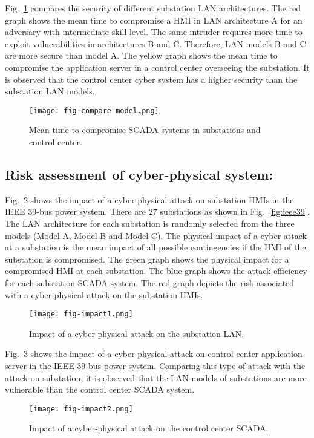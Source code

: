 Fig.~\ref{fig:result-compare} compares the security of different substation LAN architectures. The red graph shows the mean time to compromise a HMI in LAN architecture A for an adversary with intermediate skill level. The same intruder requires more time to exploit vulnerabilities in architectures B and C. Therefore, LAN models B and C are more secure than model A. The yellow graph shows the mean time to compromise the application server in a control center overseeing the substation. It is observed that the control center cyber system has a higher security than the substation LAN models.
\begin{figure}[htbp]
	\centering
	\texttt{[image: fig-compare-model.png]}
	\caption{Mean time to compromise SCADA systems in substations and control center.}
	\label{fig:result-compare}
\end{figure}

\subsection{Risk assessment of cyber-physical system:} 
Fig.~\ref{fig:impact1} shows the impact of a cyber-physical attack on substation HMIs in the IEEE 39-bus power system. There are $27$ substations as shown in Fig.~\ref{fig:ieee39}. The LAN architecture for each substation is randomly selected from the three models (Model A, Model B and Model C). The physical impact of a cyber attack at a substation is the mean impact of all possible contingencies if the HMI of the substation is compromised. The green graph shows the physical impact for a compromised HMI at each substation. The blue graph shows the attack efficiency for each substation SCADA system. The red graph depicts the risk associated with a cyber-physical attack on the substation HMIs.
\begin{figure}[htbp]
	\centering
	\texttt{[image: fig-impact1.png]}
	\caption{Impact of a cyber-physical attack on the substation LAN.}
	\label{fig:impact1}
\end{figure}

Fig.~\ref{fig:impact2} shows the impact of a cyber-physical attack on control center application server in the IEEE 39-bus power system. Comparing this type of attack with the attack on substation, it is observed that the LAN models of substations are more vulnerable than the control center SCADA system.
\begin{figure}[htbp]
	\centering
	\texttt{[image: fig-impact2.png]}
	\caption{Impact of a cyber-physical attack on the control center SCADA.}
	\label{fig:impact2}
\end{figure}